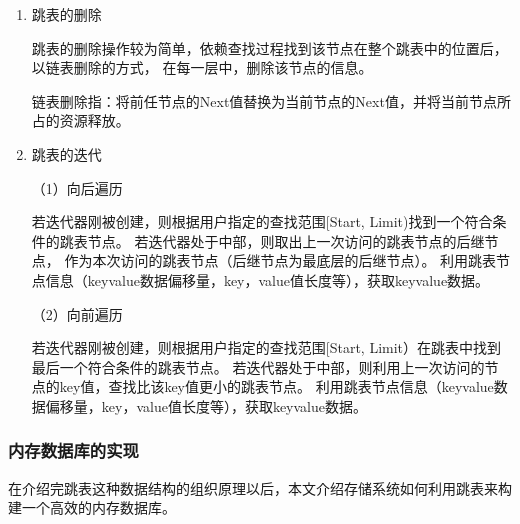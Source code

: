\begin{enumerate}
		\item 跳表的删除

		跳表的删除操作较为简单，依赖查找过程找到该节点在整个跳表中的位置后，以链表删除的方式，
		在每一层中，删除该节点的信息。

		链表删除指：将前任节点的Next值替换为当前节点的Next值，并将当前节点所占的资源释放。

		\item 跳表的迭代
		
		（1）向后遍历

		若迭代器刚被创建，则根据用户指定的查找范围[Start, Limit)找到一个符合条件的跳表节点。
		若迭代器处于中部，则取出上一次访问的跳表节点的后继节点，
		作为本次访问的跳表节点（后继节点为最底层的后继节点）。
		利用跳表节点信息（keyvalue数据偏移量，key，value值长度等），获取keyvalue数据。
		
		（2）向前遍历

		若迭代器刚被创建，则根据用户指定的查找范围[Start, Limit）在跳表中找到最后一个符合条件的跳表节点。
		若迭代器处于中部，则利用上一次访问的节点的key值，查找比该key值更小的跳表节点。
		利用跳表节点信息（keyvalue数据偏移量，key，value值长度等），获取keyvalue数据。

	\end{enumerate}

		\subsubsection{内存数据库的实现}

		在介绍完跳表这种数据结构的组织原理以后，本文介绍存储系统如何利用跳表来构建一个高效的内存数据库。

